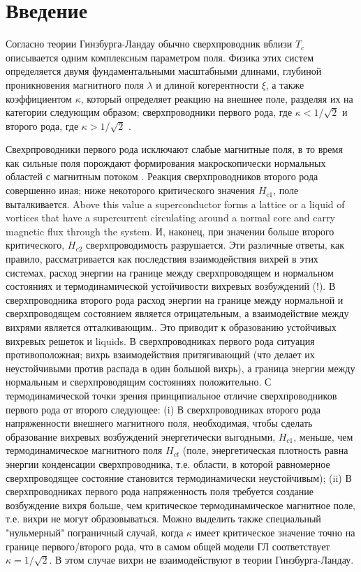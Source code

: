 \chapter{Введение}
\label{ch:1}

Согласно теории Гинзбурга-Ландау обычно сверхпроводник вблизи \( T_c \) 
описывается одним комплексным параметром поля. Физика этих систем определяется 
двумя фундаментальными масштабными длинами, глубиной проникновения магнитного 
поля \( \lambda \) и длиной когерентности \( \xi \), а также коэффициентом 
\( \kappa \), который определяет реакцию на внешнее поле, разделяя их на 
категории следующим образом; сверхпроводники первого рода, где 
\( \kappa < 1/\sqrt{2} \) и второго рода, где \( \kappa > 1/\sqrt{2} \) 
\cite{bib:3}.

Свехрпроводники первого рода исключают слабые магнитные поля, в то время как 
сильные поля порождают формирования макроскопически нормальных областей с 
магнитным потоком \cite{bib:4}. Реакция сверхпроводников второго рода 
совершенно иная; ниже некоторого критического значения \( H_{c1} \), поле 
выталкивается. 
Above 
this value a superconductor forms a lattice or a liquid of vortices that have a 
supercurrent circulating around a normal core and carry magnetic flux through 
the system. 
И, наконец, при значении больше второго критического, \( H_{c2} \) 
сверхпроводимость разрушается. Эти различные ответы, как правило, 
рассматривается как последствия взаимодействия вихрей в этих системах, расход 
энергии на границе между сверхпроводящем и нормальном состояниях и 
термодинамической устойчивости вихревых возбуждений (!). В сверхпроводника 
второго рода расход энергии на границе между нормальной и сверхпроводящем 
состоянием является отрицательным, а взаимодействие между вихрями является 
отталкивающим.\cite{bib:3}. Это приводит к образованию устойчивых вихревых 
решеток и liquids. В сверхпроводниках первого рода ситуация противоположная; 
вихрь взаимодействия притягивающий (что делает их неустойчивыми против распада 
в один большой вихрь), а граница энергии между нормальным и сверхпроводящим 
состояниях положительно. С термодинамической точки зрения принципиальное 
отличие сверхпроводников первого рода от второго следующее: (i) В 
сверхпроводниках второго рода напряженности внешнего магнитного поля, 
необходимая, чтобы сделать образование вихревых возбуждений энергетически 
выгодными, \( H_{c1} \), меньше, чем термодинамическое магнитного поля 
\( H_{ct} \) (поле, энергетическая плотность равна энергии конденсации 
сверхпроводника, т.е. области, в которой равномерное сверхпроводящее состояние 
становится термодинамически неустойчивым); (ii) В сверхпроводниках первого рода 
напряженность поля требуется создание возбуждение вихря больше, чем 
критическое термодинамическое магнитное поле, т.е. вихри не могут 
образовываться. Можно выделить также специальный "нульмерный" пограничный 
случай, когда \( \kappa \) имеет критическое значение точно на границе 
первого/второго рода, что в самом общей модели ГЛ соответствует 
\( \kappa = 1/\sqrt{2} \). В этом случае вихри не взаимодействуют\cite{bib:5} 
в теории Гинзбурга-Ландау.

